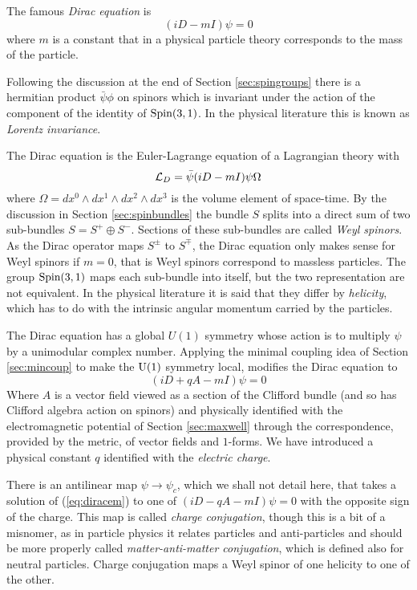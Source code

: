 \documentclass[12pt,titlepage]{article}
\def\cL{{\cal L}}
\def\Spin{\hbox{Spin}}
\def\U{\hbox{U}}
\begin{document}
The famous {\em Dirac equation\/}
%
is 
\[
(iD - mI)\psi = 0
\]%
where \(m\) is a constant that in a physical
particle theory corresponds to the mass of the particle. 

Following the discussion at the end of Section \ref{sec:spingroups}
there is a hermitian product \(\bar\psi\phi\) on spinors 
which is invariant
under the action of the component of the identity of \(\Spin(3,1)\).
In the physical literature this is known as {\em Lorentz invariance\/}.

The Dirac equation is the
Euler-Lagrange equation of a Lagrangian theory with
\[
\cL_D = \bar\psi(iD-mI)\psi\Omega
\]
 where \(\Omega =dx^0\wedge dx^1 \wedge dx^2 \wedge dx^3\) is the volume
element of space-time. 
By the discussion in Section \ref{sec:spinbundles} the bundle
\(S\) splits into a direct sum of two sub-bundles \(S=S^+\oplus S^-\). 
Sections of these sub-bundles are called {\em Weyl spinors\/}. As the
Dirac operator maps \(S^\pm\) to \(S^\mp\), the Dirac equation only
makes sense for Weyl spinors if \(m=0\), that is Weyl spinors correspond
to massless particles.   The group \(\Spin(3,1)\) maps each
sub-bundle into itself, but the two representation are
not equivalent.
In the physical literature it is said that
they differ by  
{\em helicity\/}, 
%
which has to do with the intrinsic angular momentum carried by
the particles.



The Dirac equation has a global \(U(1)\) symmetry  whose action is
to multiply \(\psi\) by a unimodular complex number. Applying the
minimal coupling idea of Section \ref{sec:mincoup} to make the \(\U(1)\)
symmetry local, modifies the Dirac equation to 
\begin{equation}\label{eq:diracem}
(iD +qA -mI)\psi = 0
\end{equation}
Where \(A\) is a vector field viewed as a section of the 
Clifford bundle (and so has Clifford algebra action on spinors) 
and  physically identified with
the electromagnetic potential of Section \ref{sec:maxwell} through the
correspondence, provided by the metric, of vector fields and \(1\)-forms. 
We have
introduced a physical constant \(q\) identified with the
%
 {\em electric
charge\/}.

There is an antilinear map \(\psi\to \psi_c\), which we shall not detail
here, that takes a solution of (\ref{eq:diracem}) to one  of 
\((iD -qA -mI)\psi = 0\)
with the opposite sign of the charge. This map is called
{\em charge conjugation\/}, 
%
though this is a bit of a misnomer, as
in particle physics it relates particles and anti-particles and should
be more properly called {\em matter-anti-matter conjugation\/}, which is
defined also for neutral particles. Charge conjugation maps a Weyl
spinor of one helicity to one of the other.
\end{document}
